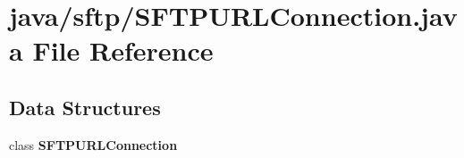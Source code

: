 \section{java/sftp/\+S\+F\+T\+P\+U\+R\+L\+Connection.java File Reference}
\label{SFTPURLConnection_8java}
\subsection*{Data Structures}
\begin{DoxyCompactItemize}
\item 
class {\bf S\+F\+T\+P\+U\+R\+L\+Connection}
\end{DoxyCompactItemize}
